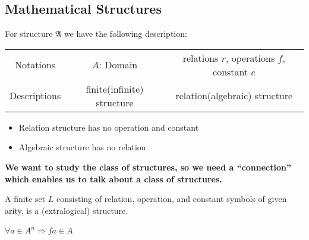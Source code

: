 \documentclass[11pt]{article}
\begin{document}
\begin{center}
\end{center}
\subsection{Mathematical Structures}
\label{sec:org6d3982a}

\begin{definition}
For structure \(\mathfrak{A}\) we have the following description:

\begin{center}
\begin{tabular}{ccc}
Notations & \(A\): Domain & relations \(r\), operations \(f\), constant \(c\)\\

Descriptions & finite(infinite) structure & relation(algebraic) structure
\end{tabular}
\end{center}

\begin{itemize}
\item Relation structure has no operation and constant
\item Algebraic structure has no relation
\end{itemize}
\end{definition}

\textbf{We want to study the class of structures, so we need a ``connection'' which enables us to talk about a class of structures.}

\begin{definition}
A finite set \(L\) consisting of relation, operation, and constant symbols of given arity, is a (extralogical) structure.
\end{definition}

\begin{definition}
\(\forall a \in A^n \Rightarrow fa \in A\).
\end{definition}
\end{document}
